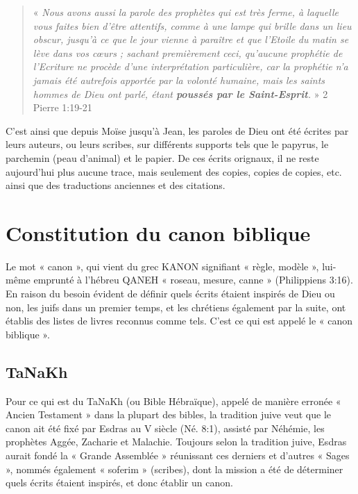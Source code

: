 \begin{small}
\begin{quote}
« \emph{Nous avons aussi la parole des prophètes qui est très ferme, à laquelle vous faites bien d'être attentifs, comme à une lampe qui brille dans un lieu obscur, jusqu'à ce que le jour vienne à paraître et que l'Etoile du matin se lève dans vos cœurs ; sachant premièrement ceci, qu'aucune prophétie de l'Ecriture ne procède d'une interprétation particulière, car la prophétie n'a jamais été autrefois apportée par la volonté humaine, mais les saints hommes de Dieu ont parlé, étant \textbf{poussés par le Saint-Esprit}.} » 2 Pierre 1:19-21
\end{quote}

C'est ainsi que depuis Moïse jusqu'à Jean, les paroles de Dieu ont été écrites par leurs auteurs, ou leurs scribes, sur différents supports tels que le papyrus, le parchemin (peau d'animal) et le papier. De ces écrits orignaux, il ne reste aujourd'hui plus aucune trace, mais seulement des copies, copies de copies, etc. ainsi que des traductions anciennes et des citations.

\section*{Constitution du canon biblique}

Le mot « canon », qui vient du grec KANON signifiant « règle, modèle », lui-même emprunté à l'hébreu QANEH « roseau, mesure, canne » (Philippiens 3:16). En raison du besoin évident de définir quels écrits étaient inspirés de Dieu ou non, les juifs dans un premier temps, et les chrétiens également par la suite, ont établis des listes de livres reconnus comme tels. C'est ce qui est appelé le « canon biblique ».

\subsection*{TaNaKh}

Pour ce qui est du TaNaKh (ou Bible Hébraïque), appelé de manière erronée « Ancien Testament » dans la plupart des bibles, la tradition juive veut que le canon ait été fixé par Esdras au V siècle (Né. 8:1), assisté par Néhémie, les prophètes Aggée, Zacharie et Malachie. Toujours selon la tradition juive, Esdras aurait fondé la « Grande Assemblée » réunissant ces derniers et d'autres « Sages », nommés également « soferim » (scribes), dont la mission a été de déterminer quels écrits étaient inspirés, et donc établir un canon.\bigskip


\end{small}
